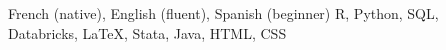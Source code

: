 
\begin{cvhonors}
    \cvhonor
    {}{French (native), English (fluent), Spanish (beginner)}{}{} %
    \cvhonor
    {}{R, Python, SQL, Databricks, LaTeX, Stata, Java, HTML, CSS}{}{} %
\end{cvhonors}